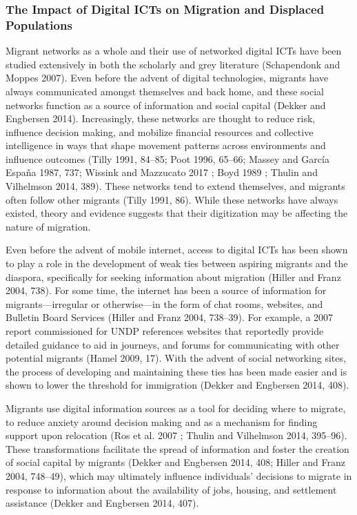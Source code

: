 \documentclass[
]{article}
\begin{document}
\hypertarget{the-impact-of-digital-icts-on-migration-and-displaced-populations}{%
\subsubsection{The Impact of Digital ICTs on Migration and Displaced
Populations}\label{the-impact-of-digital-icts-on-migration-and-displaced-populations}}

Migrant networks as a whole and their use of networked digital ICTs have
been studied extensively in both the scholarly and grey literature
(Schapendonk and Moppes 2007). Even before the advent of digital
technologies, migrants have always communicated amongst themselves and
back home, and these social networks function as a source of information
and social capital (Dekker and Engbersen 2014). Increasingly, these
networks are thought to reduce risk, influence decision making, and
mobilize financial resources and collective intelligence in ways that
shape movement patterns across environments and influence outcomes
(Tilly 1991, 84--85; Poot 1996, 65--66; Massey and García España 1987,
737; Wissink and Mazzucato 2017 ; Boyd 1989 ; Thulin and Vilhelmson
2014, 389). These networks tend to extend themselves, and migrants often
follow other migrants (Tilly 1991, 86). While these networks have always
existed, theory and evidence suggests that their digitization may be
affecting the nature of migration.

Even before the advent of mobile internet, access to digital ICTs has
been shown to play a role in the development of weak ties between
aspiring migrants and the diaspora, specifically for seeking information
about migration (Hiller and Franz 2004, 738). For some time, the
internet has been a source of information for migrants---irregular or
otherwise---in the form of chat rooms, websites, and Bulletin Board
Services (Hiller and Franz 2004, 738--39). For example, a 2007 report
commissioned for UNDP references websites that reportedly provide
detailed guidance to aid in journeys, and forums for communicating with
other potential migrants (Hamel 2009, 17). With the advent of social
networking sites, the process of developing and maintaining these ties
has been made easier and is shown to lower the threshold for immigration
(Dekker and Engbersen 2014, 408).

Migrants use digital information sources as a tool for deciding where to
migrate, to reduce anxiety around decision making and as a mechanism for
finding support upon relocation (Ros et al. 2007 ; Thulin and Vilhelmson
2014, 395--96). These transformations facilitate the spread of
information and foster the creation of social capital by migrants
(Dekker and Engbersen 2014, 408; Hiller and Franz 2004, 748--49), which
may ultimately influence individuals' decisions to migrate in response
to information about the availability of jobs, housing, and settlement
assistance (Dekker and Engbersen 2014, 407).
\end{document}
